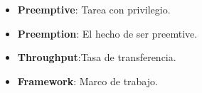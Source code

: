 \begin{itemize}
\item \textbf{Preemptive}: Tarea con privilegio.
\item \textbf{Preemption}: El hecho de ser preemtive.
\item \textbf{Throughput}:Tasa de transferencia.
\item \textbf{Framework}: Marco de trabajo.
\end{itemize}  